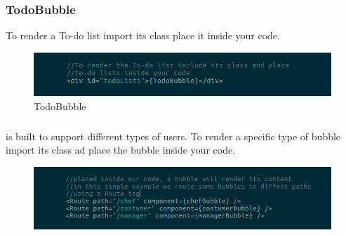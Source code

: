 \subsubsection{TodoBubble}
To render a To-do list import its class place it inside your code. 
\begin{figure}[H]
	\centering
	\includegraphics[width=14cm]{../../documenti/UserManualFramework/framework_view/22framework_view_todo.png}
	\caption{TodoBubble}
\end{figure}

\subsubsection{\DemoName{}}
\DemoName{} is built to support different types of users. To render a specific type of bubble import its class ad place the bubble inside your code.  
\begin{figure}[H]
	\centering
	\includegraphics[width=14cm]{../../documenti/UserManualFramework/framework_view/21framework_view_demo.png}
	\caption{\DemoName{}}
\end{figure}
